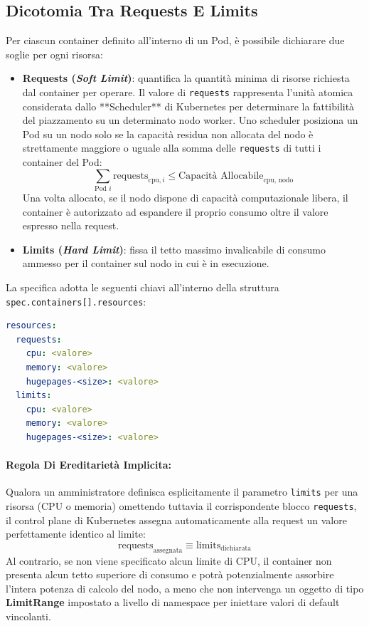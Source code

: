 \documentclass[11pt, a4paper]{article}
\begin{document}
\subsection{Dicotomia Tra Requests E Limits}

Per ciascun container definito all'interno di un Pod, è possibile dichiarare due soglie per ogni risorsa:

\begin{itemize}
    \item \textbf{Requests (\emph{Soft Limit})}: quantifica la quantità minima di risorse richiesta dal container per operare. Il valore di \texttt{requests} rappresenta l'unità atomica considerata dallo **Scheduler** di Kubernetes per determinare la fattibilità del piazzamento su un determinato nodo worker. Uno scheduler posiziona un Pod su un nodo solo se la capacità residua non allocata del nodo è strettamente maggiore o uguale alla somma delle \texttt{requests} di tutti i container del Pod:
    \[
    \sum_{\text{Pod } i} \text{requests}_{\text{cpu}, i} \le \text{Capacit\`a Allocabile}_{\text{cpu, nodo}}
    \]
    Una volta allocato, se il nodo dispone di capacità computazionale libera, il container è autorizzato ad espandere il proprio consumo oltre il valore espresso nella request.
    \item \textbf{Limits (\emph{Hard Limit})}: fissa il tetto massimo invalicabile di consumo ammesso per il container sul nodo in cui è in esecuzione.
\end{itemize}

La specifica adotta le seguenti chiavi all'interno della struttura \texttt{spec.containers[].resources}:
\begin{lstlisting}[language=yaml]
resources:
  requests:
    cpu: <valore>
    memory: <valore>
    hugepages-<size>: <valore>
  limits:
    cpu: <valore>
    memory: <valore>
    hugepages-<size>: <valore>
\end{lstlisting}

\paragraph{Regola Di Ereditarietà Implicita:} Qualora un amministratore definisca esplicitamente il parametro \texttt{limits} per una risorsa (CPU o memoria) omettendo tuttavia il corrispondente blocco \texttt{requests}, il control plane di Kubernetes assegna automaticamente alla request un valore perfettamente identico al limite:
\[
\text{requests}_{\text{assegnata}} \equiv \text{limits}_{\text{dichiarata}}
\]
Al contrario, se non viene specificato alcun limite di CPU, il container non presenta alcun tetto superiore di consumo e potrà potenzialmente assorbire l'intera potenza di calcolo del nodo, a meno che non intervenga un oggetto di tipo \textbf{LimitRange} impostato a livello di namespace per iniettare valori di default vincolanti.
\end{document}
